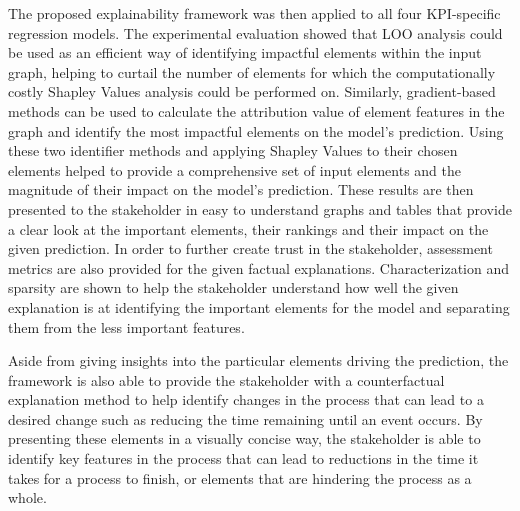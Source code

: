The proposed explainability framework was then applied to all four KPI-specific regression models. The experimental evaluation showed that LOO analysis could be used as an efficient way of identifying impactful elements within the input graph, helping to curtail the number of elements for which the computationally costly Shapley Values analysis could be performed on. Similarly, gradient-based methods can be used to calculate the attribution value of element features in the graph and identify the most impactful elements on the model's prediction. Using these two identifier methods and applying Shapley Values to their chosen elements helped to provide a comprehensive set of input elements and the magnitude of their impact on the model's prediction. These results are then presented to the stakeholder in easy to understand graphs and tables that provide a clear look at the important elements, their rankings and their impact on the given prediction. In order to further create trust in the stakeholder, assessment metrics are also provided for the given factual explanations. Characterization and sparsity are shown to help the stakeholder understand how well the given explanation is at identifying the important elements for the model and separating them from the less important features.


Aside from giving insights into the particular elements driving the prediction, the framework is also able to provide the stakeholder with a counterfactual explanation method to help identify changes in the process that can lead to a desired change such as reducing the time remaining until an event occurs. By presenting these elements in a visually concise way, the stakeholder is able to identify key features in the process that can lead to reductions in the time it takes for a process to finish, or elements that are hindering the process as a whole.


